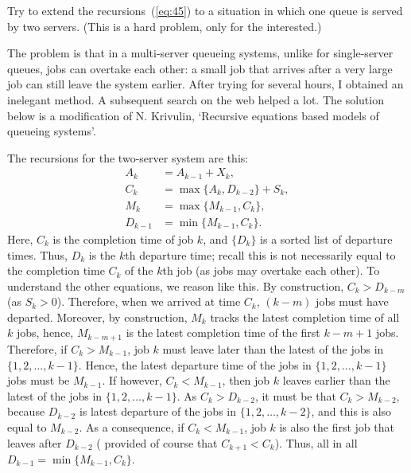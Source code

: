 \begin{exercise}  Try to extend the recursions~(\ref{eq:45})  to a situation in which one queue is
  served by two servers.  (This is a hard problem, only for the interested.)
    \begin{hint} The problem is
      that in a multi-server queueing systems, unlike for
      single-server queues, jobs can overtake each other: a small job
      that arrives after a very large job can still leave the system
      earlier. After trying for several hours, I obtained an inelegant
      method. A subsequent search on the web helped a lot. The
      solution below is a modification of N. Krivulin, `Recursive
      equations based models of queueing systems'. 
    \end{hint}
  \begin{solution}
The recursions for the two-server system are this: 
      \begin{equation*}
        \begin{split}
          A_k &= A_{k-1} + X_k, \\
          C_k &= \max\{A_k, D_{k-2}\} + S_k,\\
          M_k &= \max\{M_{k-1}, C_k\}, \\
          D_{k-1} &= \min\{M_{k-1}, C_k\}.
        \end{split}
      \end{equation*}
      Here, $C_k$ is the completion time of job $k$, and $\{D_k\}$ is
      a sorted list of departure times. Thus, $D_k$ is the $k$th
      departure time; recall this is not necessarily equal to the
      completion time $C_k$ of the $k$th job (as jobs may overtake
      each other). To understand the other equations, we reason like
      this.  By construction, $C_k > D_{k-m}$ (as $S_k >0$).
      Therefore, when we arrived at time $C_k$, $(k-m)$ jobs must have
      departed. Moreover, by construction, $M_k$ tracks the latest
      completion time of all $k$ jobs, hence, $M_{k-m+1}$ is the latest
      completion time of the first $k-m+1$ jobs. Therefore, if
      $C_k>M_{k-1}$, job $k$ must leave later than the latest of the
      jobs in $\{1,2,\ldots, k-1\}$.  Hence, the latest departure time
      of the jobs in $\{1, 2, \ldots, k-1\}$ jobs must be
      $M_{k-1}$. If however, $C_k<M_{k-1}$, then job $k$ leaves
      earlier than the latest of the jobs in $\{1,2,\ldots, k-1\}$. As
      $C_k>D_{k-2}$, it must be that $C_k > M_{k-2}$, because
      $D_{k-2}$ is latest departure of the jobs in
      $\{1,2,\ldots, k-2\}$, and this is also equal to $M_{k-2}$. As a
      consequence, if $C_k < M_{k-1}$, job $k$ is also the first job
      that leaves after $D_{k-2}$ ( provided of course that
      $C_{k+1} < C_k$). Thus, all in all
      $D_{k-1} = \min\{M_{k-1}, C_k\}$.


\end{solution}
\end{exercise}

